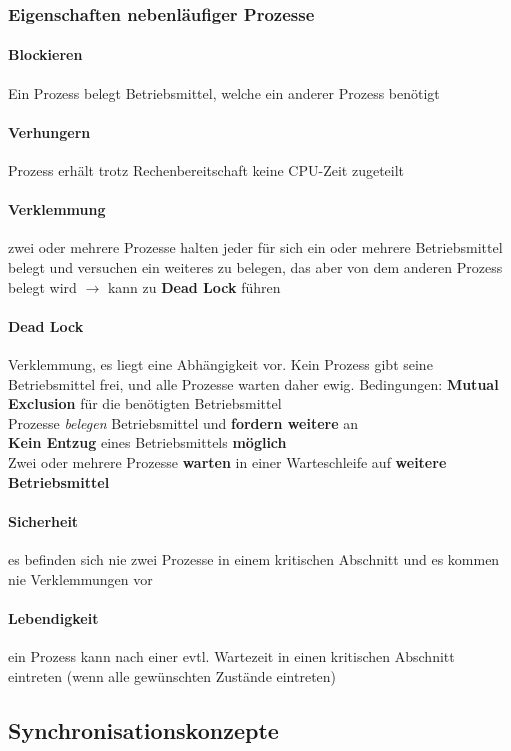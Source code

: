 \documentclass[10pt,a4paper,landscape]{article}
\begin{document}
\begin{multicols*}{3}
	\subsubsection{Eigenschaften nebenläufiger Prozesse}
	\paragraph{Blockieren} Ein Prozess belegt Betriebsmittel, welche ein anderer Prozess benötigt
	\paragraph{Verhungern} Prozess erhält trotz Rechenbereitschaft keine CPU-Zeit zugeteilt
	\paragraph{Verklemmung} zwei oder mehrere Prozesse halten jeder für sich ein oder mehrere Betriebsmittel belegt und versuchen ein weiteres zu belegen, das aber von dem anderen Prozess belegt wird $\rightarrow$ kann zu \textbf{Dead Lock} führen
	\paragraph{Dead Lock} Verklemmung, es liegt eine Abhängigkeit vor. Kein Prozess gibt seine Betriebsmittel frei, und alle Prozesse warten daher ewig. Bedingungen: \textbf{Mutual Exclusion} für die benötigten Betriebsmittel\\ Prozesse \textit{belegen} Betriebsmittel und \textbf{fordern weitere} an\\ \textbf{Kein Entzug} eines Betriebsmittels \textbf{möglich}\\ Zwei oder mehrere Prozesse \textbf{warten} in einer Warteschleife auf \textbf{weitere Betriebsmittel}
	\paragraph{Sicherheit} es befinden sich nie zwei Prozesse in einem kritischen Abschnitt und es kommen nie Verklemmungen vor
	\paragraph{Lebendigkeit} ein Prozess kann nach einer evtl. Wartezeit in einen kritischen Abschnitt eintreten (wenn alle gewünschten Zustände eintreten)
	\subsection{Synchronisationskonzepte}

\end{multicols*}
\end{document}
